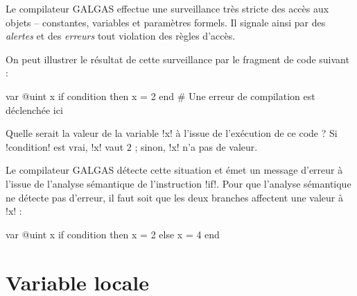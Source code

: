 
\newcommand\FlecheEtatInitial[2]{
  \node[#2 of #1,draw=black,circle,thick,fill=\FondAutomate] (Z) {};
  \draw[-stealth,thick,black] (Z) -- (#1);
}


Le compilateur GALGAS effectue une surveillance très stricte des accès aux objets -- constantes, variables et paramètres formels. Il signale ainsi par des \emph{alertes} et des \emph{erreurs} tout violation des règles d'accès.

On peut illustrer le résultat de cette surveillance par le fragment de code suivant :
\begin{galgas}
var @uint x
if condition then
  x = 2
end # Une erreur de compilation est déclenchée ici
\end{galgas}

Quelle serait la valeur de la variable \ggs!x! à l'issue de l'exécution de ce code ? Si \ggs!condition! est vrai, \ggs!x! vaut $2$ ; sinon, \ggs!x! n'a pas de valeur.

Le compilateur GALGAS détecte cette situation et émet un message d'erreur à l'issue de l'analyse sémantique de l'instruction \ggs!if!. Pour que l'analyse sémantique ne détecte pas d'erreur, il faut soit que les deux branches affectent une valeur à \ggs!x! :

\begin{galgas}
var @uint x
if condition then
  x = 2
else
  x = 4
end
\end{galgas}















\section{Variable locale}

